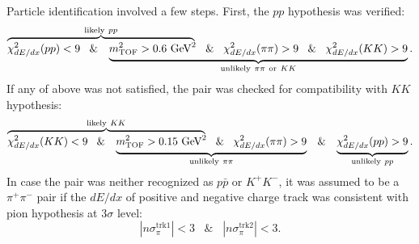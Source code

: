 Particle identification involved a few steps. First, the $pp$ hypothesis was verified:
\begin{equation}\label{eq:pidPPbar}\lefteqn{\overbrace{\phantom{\chi^{2}_{dE/dx}(pp)<9\;\;\; \& \;\;\; m^{2}_{\text{TOF}} > 0.6~\mbox{GeV}^{2}}}^{\text{likely}~pp}}\chi^{2}_{dE/dx}(pp)<9\;\;\; \& \;\;\; \underbrace{m^{2}_{\text{TOF}} > 0.6~\mbox{GeV}^{2}\;\;\; \& \;\;\; \chi^{2}_{dE/dx}(\pi\pi)>9\;\;\; \& \;\;\; \chi^{2}_{dE/dx}(KK)>9}_{\text{unlikely}~\pi\pi~\text{or}~KK}.\end{equation}
If any of above was not satisfied, the pair was checked for compatibility with $KK$ hypothesis:
%
\begin{equation}\label{eq:pidKK}%
\lefteqn{\overbrace{\phantom{\chi^{2}_{dE/dx}(KK)<9\;\;\; \& \;\;\; m^{2}_{\text{TOF}} > 0.15~\mbox{GeV}^{2}}}^{\text{likely}~KK}}\chi^{2}_{dE/dx}(KK)<9\;\;\; \& \;\;\; \underbrace{m^{2}_{\text{TOF}} > 0.15~\mbox{GeV}^{2}\;\;\; \& \;\;\; \chi^{2}_{dE/dx}(\pi\pi)>9}_{\text{unlikely}~\pi\pi}\;\;\; \& \;\;\; \underbrace{\chi^{2}_{dE/dx}(pp)>9}_{\text{unlikely}~pp}.
\end{equation}
%
In case the pair was neither recognized as $p\bar{p}$ or $K^{+}K^{-}$, it was assumed to be a $\pi^{+}\pi^{-}$ pair if the $dE/dx$ of positive and negative charge track was consistent with pion hypothesis at $3\sigma$ level:
\begin{equation}\label{eq:pidPiPi}|n\sigma_{\pi}^{\text{trk1}}|<3\;\;\; \& \;\;\; |n\sigma_{\pi}^{\text{trk2}}|<3.\end{equation}



% 
% 
 
